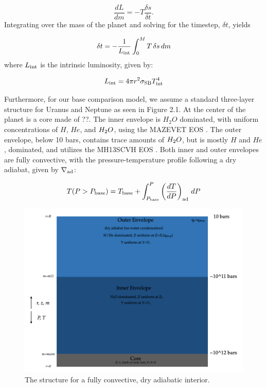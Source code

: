 \documentclass[11pt]{ucscthesisbs}
\begin{document}
\begin{equation}
  \frac{dL}{dm}=-T\frac{\delta s}{\delta t}.
\end{equation}
Integrating over the mass of the planet and solving for the timestep, $\delta t$, yields

\begin{equation}
  \delta t=-\frac{1}{L_{\rm int}}\int_0^M T\,\delta s\,dm
\end{equation}
where $L_{\rm int}$ is the intrinsic luminosity, given by:

\begin{equation}
  L_{\rm int} = 4\pi r^{2}\sigma_{\rm SB}T_{\rm int}^{4}
\end{equation}

Furthermore, for our base comparison model, we assume a standard three-layer structure for Uranus and Neptune as seen in Figure 2.1. At the center of the planet is a core made of ??. The inner envelope is $H_{2}O$ dominated, with uniform concentrations of $H$, $He$, and $H_{\rm{2}}O$, using the MAZEVET EOS \citep{mazevet_2019}. The outer envelope, below 10 bars, contains trace amounts of $H_{\rm{2}}O$, but is mostly $H$ and $He$, dominated, and utilizes the MH13SCVH EOS \citep{miguel_2018}. Both  inner and outer envelopes are fully convective, with the pressure-temperature profile following a dry adiabat, given by $\nabla_{\rm ad}$:

\begin{equation}
T(P>P_{\rm base}) = T_{\rm base} + \int_{P_{\rm base}}^P\left(\frac{dT}{dP}\right)_{\rm ad}\,d P
\end{equation}

\begin{figure}[ht!]
 \centerline{
  \includegraphics[width=6.0in]{figures/structure_schematic_images/structure_schematic_images.001.png}
 }
\caption[A Standard Interior Structure Model]
{The structure for a fully convective, dry adiabatic interior.}
\label{fig:standard_dry_interior}
\end{figure}
\end{document}
